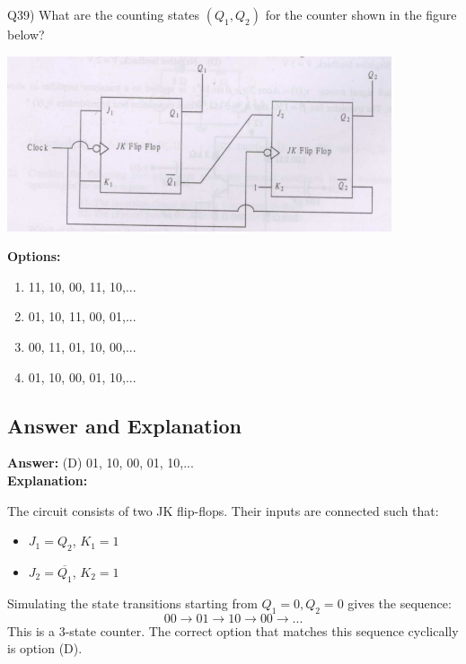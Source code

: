 \documentclass[12pt]{article}
\begin{document}
\noindent
Q39) What are the counting states $(Q_1, Q_2)$ for the counter shown in the figure below?

\vspace{1em}
\includegraphics[width=0.85\textwidth]{gate39.png}

\vspace{1em}
{\color{MidnightBlue}\textbf{Options:}}
\begin{enumerate}[label=(\Alph*)]
    \item 11, 10, 00, 11, 10,...
    \item 01, 10, 11, 00, 01,...
    \item 00, 11, 01, 10, 00,...
    \item 01, 10, 00, 01, 10,...
\end{enumerate}

\vspace{1em}
{\color{MidnightBlue}\subsection*{Answer and Explanation}}
\textbf{Answer:} (D) 01, 10, 00, 01, 10,...\\

\textbf{Explanation:}

The circuit consists of two JK flip-flops. Their inputs are connected such that:
\begin{itemize}
    \item $J_1 = Q_2$, $K_1 = 1$
    \item $J_2 = \overline{Q_1}$, $K_2 = 1$
\end{itemize}

Simulating the state transitions starting from $Q_1 = 0, Q_2 = 0$ gives the sequence:
\[
00 \rightarrow 01 \rightarrow 10 \rightarrow 00 \rightarrow ...
\]
This is a 3-state counter. The correct option that matches this sequence cyclically is option (D).
\end{document}
